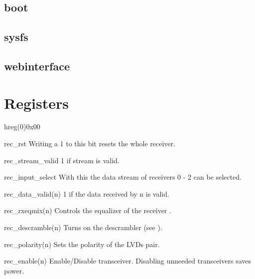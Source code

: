 \documentclass[11pt,technote,a4paper,onecolumn,dvips]{IEEEtran}
\begin{document}
\subsection{boot}
\subsection{sysfs}
\subsection{webinterface}


\clearpage
\appendices
\section{Registers}
\begin{register}{h}{reg(0)}{0x00}%
    \label{reg0}%
    \regnewline%
    \begin{regdesc}\begin{reglist}
        \item[rec\_rst] Writing a 1 to this bit resets the whole receiver.
        \item[rec\_stream\_valid] 1 if stream is valid.
        \item[rec\_input\_select] With this the data stream of receivers 0 - 2
            can be selected.
        \item[rec\_data\_valid(n)] 1 if the data received by n is valid.
        \item[rec\_rxeqmix(n)] Controls the equalizer of the receiver
            \cite[p. 165f]{gtx}.
        \item[rec\_descramble(n)] Turns on the descrambler (see
            ).
        \item[rec\_polarity(n)] Sets the polarity of the LVDs pair.
        \item[rec\_enable(n)] Enable/Disable transceiver. Disabling unneeded
            transceivers saves power.
    \end{reglist}\end{regdesc}
\end{register}
\end{document}
